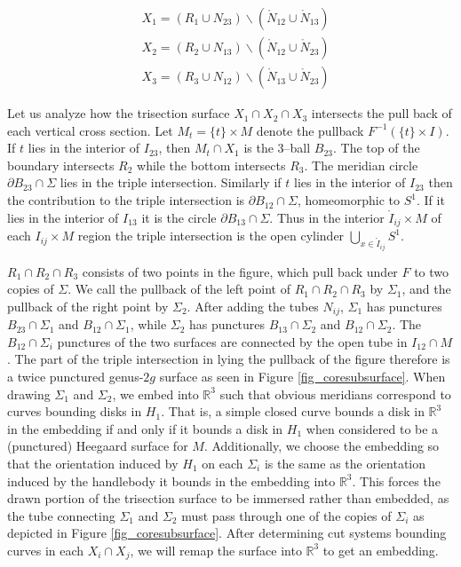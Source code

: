 \documentclass[12pt]{amsart}
\newcommand{\R}{\mathbb{R}}
\newcommand{\del}{\partial }
\theoremstyle{definition}
\theoremstyle{remark}
\begin{document}
\begin{align*}
&X_1 = (R_1 \cup N_{23}) \backslash (\mathring N_{12} \cup \mathring N_{13}) \\
&X_2 = (R_2 \cup N_{13}) \backslash (\mathring N_{12} \cup \mathring N_{23}) \\
&X_3 = (R_3 \cup N_{12}) \backslash (\mathring N_{13} \cup \mathring N_{23}) 
\end{align*}

Let us analyze how the trisection surface $X_1 \cap X_2 \cap X_3$ intersects the pull back of each vertical cross section.  Let $M_t = \{t\} \times M$ denote the pullback $F^{-1}(\{t\} \times I)$.  If $t$ lies in the interior of $I_{23}$, then $M_t \cap X_1$ is the 3--ball $B_{23}$.  The top of the boundary intersects $R_2$ while the bottom intersects $R_3$.  The meridian circle $\del B_{23} \cap \Sigma$ lies in the triple intersection.  Similarly if $t$ lies in the interior of $I_{23}$ then the contribution to the triple intersection is $\del B_{12} \cap \Sigma$, homeomorphic to $S^1$.  If it lies in the interior of $I_{13}$ it is the circle $\del B_{13} \cap \Sigma$.  Thus in the interior $\mathring I_{ij} \times M$ of each $I_{ij} \times M$ region the triple intersection is the open cylinder $\bigcup_{x \in \mathring I_{ij}} S^1$.  

$R_1 \cap R_2 \cap R_3$ consists of two points in the figure, which pull back under $F$ to two copies of $\Sigma$.  We call the pullback of the left point of $R_1 \cap R_2 \cap R_3$ by $\Sigma_1$, and the pullback of the right point by $\Sigma_2$.  After adding the tubes $N_{ij}$, $\Sigma_1$ has punctures $B_{23} \cap \Sigma_1$ and $B_{12} \cap \Sigma_1$, while $\Sigma_2$ has punctures $B_{13} \cap \Sigma_2$ and $B_{12} \cap \Sigma_2$.  The $B_{12} \cap \Sigma_i$ punctures of the two surfaces are connected by the open tube in $I_{12} \cap M$.   The part of the triple intersection in lying the pullback of the figure therefore is a twice punctured genus-$2g$ surface as seen in Figure \ref{fig_coresubsurface}.  When drawing $\Sigma_1$ and $\Sigma_2$, we embed into $\R^3$ such that obvious meridians correspond to curves bounding disks in $H_1$.  That is, a simple closed curve bounds a disk in $\R^3$ in the embedding if and only if it bounds a disk in $H_1$ when considered to be a (punctured) Heegaard surface for $M$.  Additionally, we choose the embedding so that the orientation induced by $H_1$ on each $\Sigma_i$ is the same as the orientation induced by the handlebody it bounds in the embedding into $\R^3$.  This forces the drawn portion of the trisection surface to be immersed rather than embedded, as the tube connecting $\Sigma_1$ and $\Sigma_2$ must pass through one of the copies of $\Sigma_i$ as depicted in Figure \ref{fig_coresubsurface}.  After determining cut systems bounding curves in each $X_i \cap X_j$, we will remap the surface into $\R^3$ to get an embedding.
\end{document}

